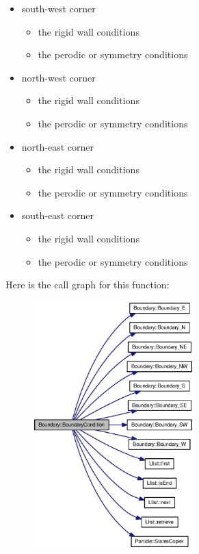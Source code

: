 \begin{itemize}
\item south-west corner \begin{itemize}
\item the rigid wall conditions

\item the perodic or symmetry conditions\end{itemize}


\item north-west corner \begin{itemize}
\item the rigid wall conditions

\item the perodic or symmetry conditions\end{itemize}


\item north-east corner \begin{itemize}
\item the rigid wall conditions

\item the perodic or symmetry conditions\end{itemize}


\item south-east corner \begin{itemize}
\item the rigid wall conditions

\item the perodic or symmetry conditions\end{itemize}
\end{itemize}


Here is the call graph for this function:\nopagebreak
\begin{figure}[H]
\begin{center}
\leavevmode
\includegraphics[width=176pt]{classBoundary_bedd190ee91482e4e59b2a613ab25d57_cgraph}
\end{center}
\end{figure}


